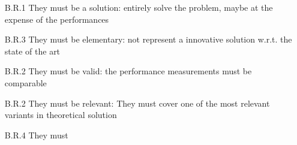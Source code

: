 \begin{enumerate}
\item[B.R.1] They must be a solution: entirely solve the problem, maybe at the expense of the performances %
\item[B.R.3] They must be elementary: not represent a innovative solution w.r.t. the state of the art %
\item[B.R.2] They must be valid: the performance measurements must be comparable %
\item[B.R.2] They must be relevant: They must cover one of the most relevant variants in theoretical solution %
\item[B.R.4] They must %
\end{enumerate}


